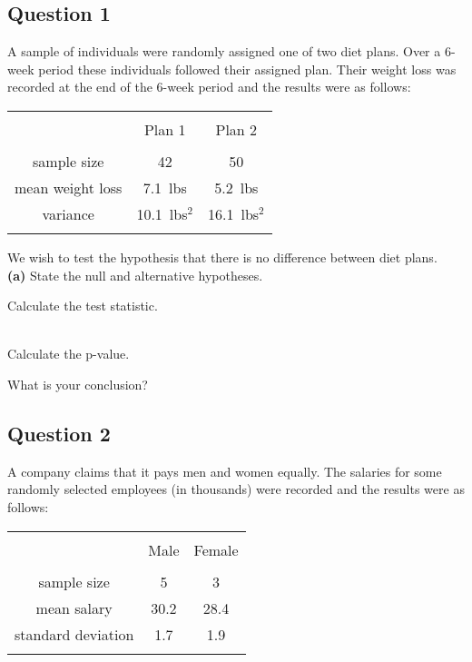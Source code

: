 \documentclass[a4paper,12pt]{article}
\begin{document}
\subsection*{Question 1}
A sample of individuals were randomly assigned one of two diet plans. 
Over a 6-week period these individuals followed their assigned plan. 
Their weight loss was recorded at the end of the 6-week period and the results were as follows: \\
\begin{center}
\begin{tabular}{|c|c|c|}
\hline
&&\\[-0.4cm]
& Plan 1 & Plan 2 \\
\hline
&&\\[-0.4cm]
sample size & 42 & 50 \\
mean weight loss & 7.1\,\,\,lbs & 5.2\,\,\,lbs \\
variance & 10.1\,\,\,lbs$^2$ & 16.1\,\,\,lbs$^2$ \\
\hline
\multicolumn{3}{c}{}\\
\end{tabular}
\end{center}

We wish to test the hypothesis that there is no difference between diet plans.\\[0.2cm]
{\bf(a)} State the null and alternative hypotheses. 
 
\item  Calculate the test statistic. 
 
\item \\ Calculate the p-value. 
 
\item  What is your conclusion?


\subsection*{Question 2}
A company claims that it pays men and women equally. The salaries for some randomly selected employees (in thousands) were recorded and the results were as follows:\\
\begin{center}
\begin{tabular}{|c|c|c|}
\hline
&&\\[-0.4cm]
& Male & Female \\
\hline
&&\\[-0.4cm]
sample size & 5 & 3 \\
mean salary & 30.2 & 28.4 \\
standard deviation & 1.7 & 1.9 \\
\hline
\multicolumn{3}{c}{}\\
\end{tabular}
\end{center}
\end{document}
